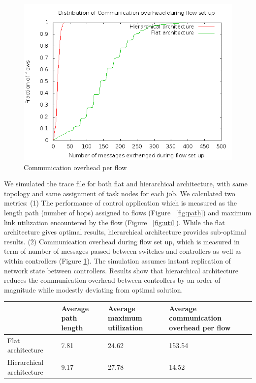 \documentclass[10pt, twocolumn]{article}
\begin{document}
\begin{figure}
\includegraphics[scale=0.3]{msg}
\caption{Communication overhead per flow}
\label{fig:msg}
\end{figure}

We simulated the trace file for both flat and hierarchical architecture, with same topology and same assignment of task nodes for each job. We calculated two metrics: (1) The performance of control application which is measured as the length path (number of hops) assigned to flows (Figure ~\ref{fig:path}) and maximum link utilization encountered by the flow (Figure ~\ref{fig:util}). While the flat architecture gives optimal results, hierarchical architecture provides sub-optimal results. (2) Communication overhead during flow set up, which is measured in term of number of messages passed between switches and controllers as well as within controllers (Figure \ref{fig:msg}). The simulation assumes instant replication of network state between controllers. Results show that hierarchical architecture reduces the communication overhead between controllers by an order of magnitude while modestly deviating from optimal solution.

\begin{table}
\centering
\begin{tabular}{| L{5cm} | L{3cm} | L{3cm} | L{5cm} |}
\hline
& {Average path length} & {Average maximum utilization} & {Average communication overhead per flow} \\ \hline
Flat architecture & 7.81 & 24.62 & 153.54 \\ \hline
Hierarchical architecture & 9.17 & 27.78 & 14.52 \\ \hline
\end{tabular}
\end{table}%
\end{document}
